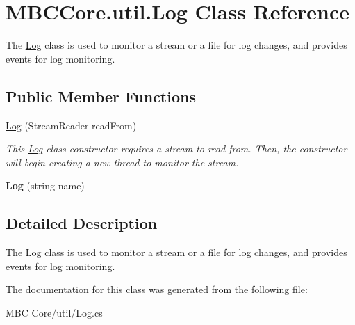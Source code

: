 \hypertarget{class_m_b_c_core_1_1util_1_1_log}{\section{M\-B\-C\-Core.\-util.\-Log Class Reference}
\label{class_m_b_c_core_1_1util_1_1_log}
}


The \hyperlink{class_m_b_c_core_1_1util_1_1_log}{Log} class is used to monitor a stream or a file for log changes, and provides events for log monitoring. 


\subsection*{Public Member Functions}
\begin{DoxyCompactItemize}
\item 
\hypertarget{class_m_b_c_core_1_1util_1_1_log_a9bcff06a36b2f8dbff6da6b2866492bf}{\hyperlink{class_m_b_c_core_1_1util_1_1_log_a9bcff06a36b2f8dbff6da6b2866492bf}{Log} (Stream\-Reader read\-From)}\label{class_m_b_c_core_1_1util_1_1_log_a9bcff06a36b2f8dbff6da6b2866492bf}

\begin{DoxyCompactList}\small\item\em This \hyperlink{class_m_b_c_core_1_1util_1_1_log}{Log} class constructor requires a stream to read from. Then, the constructor will begin creating a new thread to monitor the stream.\end{DoxyCompactList}\item 
\hypertarget{class_m_b_c_core_1_1util_1_1_log_aece3e41872ca5c79549edb90ada26772}{{\bfseries Log} (string name)}\label{class_m_b_c_core_1_1util_1_1_log_aece3e41872ca5c79549edb90ada26772}

\end{DoxyCompactItemize}


\subsection{Detailed Description}
The \hyperlink{class_m_b_c_core_1_1util_1_1_log}{Log} class is used to monitor a stream or a file for log changes, and provides events for log monitoring.

The documentation for this class was generated from the following file\-:\begin{DoxyCompactItemize}
\item 
M\-B\-C Core/util/Log.\-cs\end{DoxyCompactItemize}
